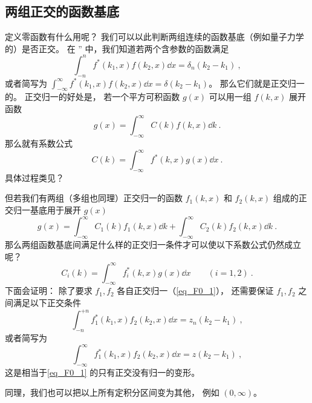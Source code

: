 \subsection{两组正交的函数基底}
定义零函数有什么用呢？ 我们可以以此判断两组连续的函数基底（例如量子力学的）是否正交。 在 ” 中，我们知道若两个含参数的函数满足
\begin{equation}\label{eq_F0_1}
\int_{-n}^{n} f^*(k_1, x) f(k_2, x)\dd{x} = \delta_n(k_2 - k_1)~,
\end{equation}
或者简写为 $\int_{-\infty}^{\infty} f^*(k_1, x) f(k_2, x)\dd{x} = \delta(k_2 - k_1)$。 那么它们就是正交归一的。 正交归一的好处是， 若一个平方可积函数 $g(x)$ 可以用一组 $f(k, x)$ 展开函数
\begin{equation}
g(x) = \int_{-\infty}^{\infty} C(k) f(k, x) \dd{k}~.
\end{equation}
那么就有系数公式
\begin{equation}
C(k) = \int_{-\infty}^{\infty} f^*(k, x)g(x)\dd{x}~.
\end{equation}
具体过程类见？

但若我们有两组（多组也同理）正交归一的函数 $f_1(k, x)$ 和 $f_2(k, x)$ 组成的正交归一基底用于展开 $g(x)$
\begin{equation}\label{eq_F0_3}
g(x) = \int_{-\infty}^{\infty} C_1(k) f_1(k, x) \dd{k} + \int_{-\infty}^{\infty} C_2(k) f_2(k, x) \dd{k}~.
\end{equation}
那么两组函数基底间满足什么样的正交归一条件才可以使以下系数公式仍然成立呢？
\begin{equation}\label{eq_F0_4}
C_i(k) = \int_{-\infty}^{\infty} f_i^*(k, x)g(x)\dd{x} \qquad (i = 1,2)~.
\end{equation}
下面会证明： 除了要求 $f_1, f_2$ 各自正交归一（\autoref{eq_F0_1}）， 还需要保证 $f_1, f_2$ 之间满足以下正交条件
\begin{equation}
\int_{-n}^{+n} f_1^*(k_1, x) f_2(k_2, x) \dd{x} = z_n(k_2 - k_1)~,
\end{equation}
或者简写为
\begin{equation}
\int_{-\infty}^{\infty} f_1^*(k_1, x) f_2(k_2, x) \dd{x} = z(k_2 - k_1)~,
\end{equation}
这是相当于\autoref{eq_F0_1} 的只有正交没有归一的变形。

同理，我们也可以把以上所有定积分区间变为其他， 例如 $(0, \infty)$。

